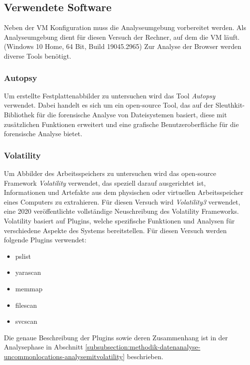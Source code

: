 \subsection*{Verwendete Software}
\label{subsection:methodik-vorbereitung-verwendetesoftware}
Neben der VM Konfiguration muss die Analyseumgebung vorbereitet werden. Als Analyseumgebung dient für diesen Versuch der Rechner, auf dem die VM läuft. (Windows 10 Home, 64 Bit, Build 19045.2965)
Zur Analyse der Browser werden diverse Tools benötigt.

\subsubsection*{Autopsy}
\label{subsubsection:methodik-vorbereitung-verwendetesoftware-autopsy}
Um erstellte Festplattenabbilder zu untersuchen wird das Tool \textit{Autopsy} verwendet. Dabei handelt es sich um ein open-source Tool, das auf der Sleuthkit-Bibliothek für die forensische Analyse von Dateisystemen basiert, diese mit zusätzlichen Funktionen erweitert und eine grafische Benutzeroberfläche für die forensische Analyse bietet. \cite{Autopsy.29.03.2023} 

\subsubsection*{Volatility}
\label{subsubsection:methodik-vorbereitung-verwendetesoftware-volatility}
Um Abbilder des Arbeitsspeichers zu untersuchen wird das open-source Framework \textit{Volatility} verwendet, das speziell darauf ausgerichtet ist, Informationen und Artefakte aus dem physischen oder virtuellen Arbeitsspeicher eines Computers zu extrahieren.
Für diesen Versuch wird \textit{Volatility3} verwendet, eine 2020 veröffentlichte vollständige Neuschreibung des Volatility Frameworks.
Volatility basiert auf Plugins, welche spezifische Funktionen und Analysen für verschiedene Aspekte des Systems bereitstellen. \cite{GitHub.05.06.2023} Für diesen Versuch werden folgende Plugins verwendet:
\begin{itemize}
\item pslist	
\item yarascan		
\item memmap	 	
\item filescan
\item svcscan
\end{itemize}
Die genaue Beschreibung der Plugins sowie deren Zusammenhang ist in der Analysephase in Abschnitt \ref{subsubsection:methodik-datenanalyse-uncommonlocations-analysemitvolatility} beschrieben.

